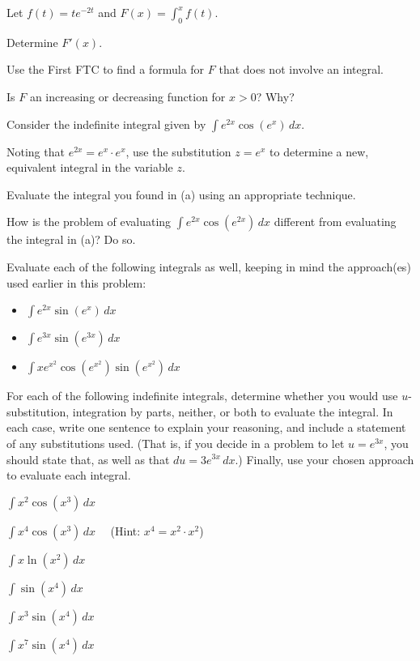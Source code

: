 \begin{exercises} 
  \item Let $f(t) = te^{-2t}$ and $F(x) = \int_0^x f(t)$.
  	\ba
		\item Determine $F'(x)$.
		\item Use the First FTC to find a formula for $F$ that does not involve an integral.
		\item Is $F$ an increasing or decreasing function for $x > 0$?  Why?
	\ea	
	
  \item Consider the indefinite integral given by $\int e^{2x} \cos(e^x) \, dx$.
  	\ba
		\item Noting that $e^{2x} = e^x \cdot e^x$, use the substitution $z = e^{x}$ to determine a new, equivalent integral in the variable $z$.
		\item Evaluate the integral you found in (a) using an appropriate technique.
		\item How is the problem of evaluating $\int e^{2x} \cos(e^{2x}) \, dx$ different from evaluating the integral in (a)?  Do so.
		\item Evaluate each of the following integrals as well, keeping in mind the approach(es) used earlier in this problem:
		\begin{itemize}
			\item $\int e^{2x} \sin(e^x) \, dx$
			\item $\int e^{3x} \sin(e^{3x}) \, dx$
			\item $\int xe^{x^2} \cos(e^{x^2}) \sin(e^{x^2}) \, dx$
		\end{itemize}
	\ea
	
	
  \item For each of the following indefinite integrals, determine whether you would use $u$-substitution, integration by parts, neither, or both to evaluate the integral.  In each case, write one sentence to explain your reasoning, and include a statement of any substitutions used.  (That is, if you decide in a problem to let $u = e^{3x}$, you should state that, as well as that $du = 3e^{3x} \, dx$.)  Finally, use your chosen approach to evaluate each integral.
\end{exercises}
	\ba
		\item $\int x^2 \cos(x^3) \, dx$
		\item $\int x^4 \cos(x^3) \, dx$ \ \ (Hint: $x^4 = x^2 \cdot x^2$)
		\item $\int x\ln(x^2) \, dx$
		\item $\int \sin(x^4) \, dx$
		\item $\int x^3 \sin(x^4) \, dx$
		\item $\int x^7 \sin(x^4) \, dx$
	\ea

\afterexercises

